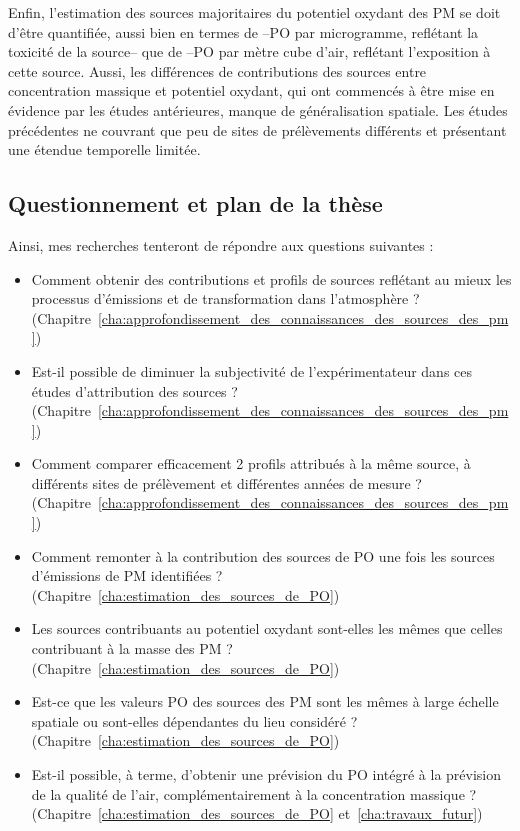 Enfin, l'estimation des sources majoritaires du potentiel oxydant des PM se doit d'être
quantifiée, aussi bien en termes de \POm{} --PO par microgramme, reflétant la toxicité de
la source-- que de \POv{} --PO par mètre cube d'air, reflétant l'exposition à cette
source.  Aussi, les différences de contributions des sources entre concentration massique
et potentiel oxydant, qui ont commencés à être mise en évidence par les études
antérieures, manque de généralisation spatiale. Les études précédentes ne couvrant que peu
de sites de prélèvements différents et présentant une étendue temporelle limitée.


\subsection{Questionnement et plan de la thèse}%
\label{sub:plan_de_la_thèse}

Ainsi, mes recherches tenteront de répondre aux questions suivantes :

\begin{itemize}
    \item Comment obtenir des contributions et profils de sources reflétant au mieux les
        processus d'émissions et de transformation dans l'atmosphère ?
        (Chapitre~\ref{cha:approfondissement_des_connaissances_des_sources_des_pm})
    \item Est-il possible de diminuer la subjectivité de l'expérimentateur dans ces
        études d'attribution des sources ?
        (Chapitre~\ref{cha:approfondissement_des_connaissances_des_sources_des_pm})
    \item Comment comparer efficacement 2 profils attribués à la même source, à
        différents sites de prélèvement et différentes années de mesure ?
        (Chapitre~\ref{cha:approfondissement_des_connaissances_des_sources_des_pm})
    \item Comment remonter à la contribution des sources de PO une fois les sources
        d'émissions de PM identifiées ?
        (Chapitre~\ref{cha:estimation_des_sources_de_PO})
    \item Les sources contribuants au potentiel oxydant sont-elles les mêmes que celles
        contribuant à la masse des PM ?
        (Chapitre~\ref{cha:estimation_des_sources_de_PO})
    \item Est-ce que les valeurs PO des sources des PM sont les mêmes à large échelle spatiale ou
        sont-elles dépendantes du lieu considéré ?
        (Chapitre~\ref{cha:estimation_des_sources_de_PO})
    \item Est-il possible, à terme, d'obtenir une prévision du PO intégré à la prévision
        de la qualité de l'air, complémentairement à la concentration massique ?
        (Chapitre~\ref{cha:estimation_des_sources_de_PO} et~\ref{cha:travaux_futur})
\end{itemize}

